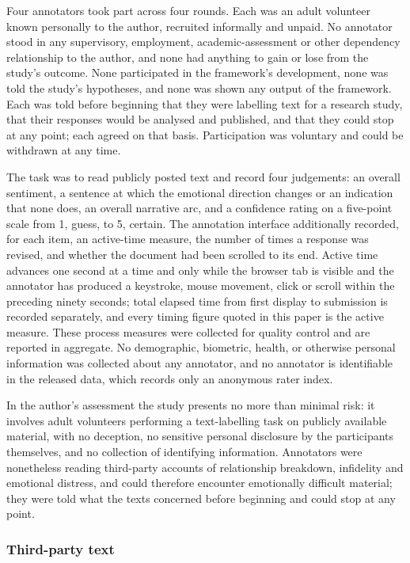\documentclass[fleqn,10pt]{wlscirep}
\begin{document}
Four annotators took part across four rounds. Each was an adult volunteer known personally to the author, recruited informally and unpaid. No annotator stood in any supervisory, employment, academic-assessment or other dependency relationship to the author, and none had anything to gain or lose from the study's outcome. None participated in
the framework's development, none was told the study's hypotheses, and none was
shown any output of the framework. Each was told before beginning that they were
labelling text for a research study, that their responses would be analysed and
published, and that they could stop at any point; each agreed on that basis.
Participation was voluntary and could be withdrawn at any time.

The task was to read publicly posted text and record four judgements: an overall
sentiment, a sentence at which the emotional direction changes or an indication
that none does, an overall narrative arc, and a confidence rating on a five-point scale from 1, guess, to 5, certain. The annotation interface additionally recorded, for each item, an active-time measure, the number of times a response was revised, and whether the document had been scrolled to its end. Active time advances one second at a time and only while the browser tab is visible and the annotator has produced a keystroke, mouse movement, click or scroll within the preceding ninety seconds; total elapsed time from first display to submission is recorded separately, and every timing figure quoted in this paper is the active measure. These process measures were collected for quality control
and are reported in aggregate. No demographic, biometric, health, or otherwise
personal information was collected about any annotator, and no annotator is
identifiable in the released data, which records only an anonymous rater index.

In the author's assessment the study presents no more than minimal risk: it
involves adult volunteers performing a text-labelling task on publicly available
material, with no deception, no sensitive personal disclosure by the participants themselves, and no collection of identifying information. Annotators were nonetheless reading third-party accounts of relationship breakdown, infidelity and emotional distress, and could therefore encounter emotionally difficult material; they were told what the texts concerned before beginning and could stop at any point.
\subsubsection*{Third-party text}
\end{document}
